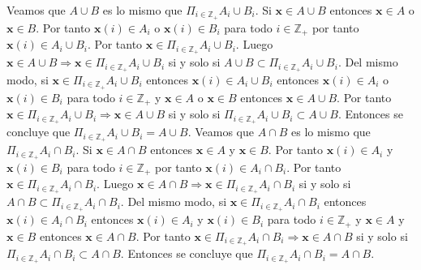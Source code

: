 \documentclass{article}
\newcommand{\vect}[1]{\boldsymbol{#1}}
\begin{document}
Veamos que $A\cup B$ es lo mismo que $\Pi_{i\in\mathbb{Z}_{+}}A_i\cup B_i$. Si $\vect{x}\in A\cup B$ entonces $\vect{x}\in A$  o $\vect{x}\in B$. Por tanto $\vect{x}(i)\in  A_i$ o $\vect{x}(i)\in  B_i$ para todo $i\in\mathbb{Z}_{+}$ por tanto $\vect{x}(i)\in  A_i\cup B_i$. Por tanto $\vect{x}\in \Pi_{i\in\mathbb{Z}_{+}}A_i\cup B_i$. Luego  $\vect{x}\in A\cup B\Rightarrow \vect{x}\in \Pi_{i\in\mathbb{Z}_{+}}A_i\cup B_i$ si y solo si $A\cup B \subset\Pi_{i\in\mathbb{Z}_{+}}A_i\cup B_i$. Del mismo modo, si $\vect{x}\in \Pi_{i\in\mathbb{Z}_{+}}A_i\cup B_i$ entonces $\vect{x}(i)\in  A_i\cup B_i$ entonces $\vect{x}(i)\in  A_i$ o $\vect{x}(i)\in  B_i$ para todo $i\in\mathbb{Z}_{+}$ y $\vect{x}\in A$  o $\vect{x}\in B$ entonces $\vect{x}\in A \cup B$. Por tanto $\vect{x}\in \Pi_{i\in\mathbb{Z}_{+}}A_i\cup B_i\Rightarrow \vect{x}\in A\cup B$ si y solo si $ \Pi_{i\in\mathbb{Z}_{+}}A_i\cup B_i\subset A\cup B$. Entonces se concluye que $ \Pi_{i\in\mathbb{Z}_{+}}A_i\cup B_i= A\cup B$.
\newline
Veamos que $A\cap B$ es lo mismo que $\Pi_{i\in\mathbb{Z}_{+}}A_i\cap B_i$. Si $\vect{x}\in A\cap B$ entonces $\vect{x}\in A$  y $\vect{x}\in B$. Por tanto $\vect{x}(i)\in  A_i$ y $\vect{x}(i)\in  B_i$ para todo $i\in\mathbb{Z}_{+}$ por tanto $\vect{x}(i)\in  A_i\cap B_i$. Por tanto $\vect{x}\in \Pi_{i\in\mathbb{Z}_{+}}A_i\cap B_i$. Luego  $\vect{x}\in A\cap B\Rightarrow \vect{x}\in \Pi_{i\in\mathbb{Z}_{+}}A_i\cap B_i$ si y solo si $A\cap B \subset\Pi_{i\in\mathbb{Z}_{+}}A_i\cap B_i$. Del mismo modo, si $\vect{x}\in \Pi_{i\in\mathbb{Z}_{+}}A_i\cap B_i$ entonces $\vect{x}(i)\in  A_i\cap B_i$ entonces $\vect{x}(i)\in  A_i$ y $\vect{x}(i)\in  B_i$ para todo $i\in\mathbb{Z}_{+}$ y $\vect{x}\in A$ y $\vect{x}\in B$ entonces $\vect{x}\in A \cap B$. Por tanto $\vect{x}\in \Pi_{i\in\mathbb{Z}_{+}}A_i\cap B_i\Rightarrow \vect{x}\in A\cap B$ si y solo si $ \Pi_{i\in\mathbb{Z}_{+}}A_i\cap B_i\subset A\cap B$. Entonces se concluye que $ \Pi_{i\in\mathbb{Z}_{+}}A_i\cap B_i= A\cap B$. 
\end{document}
